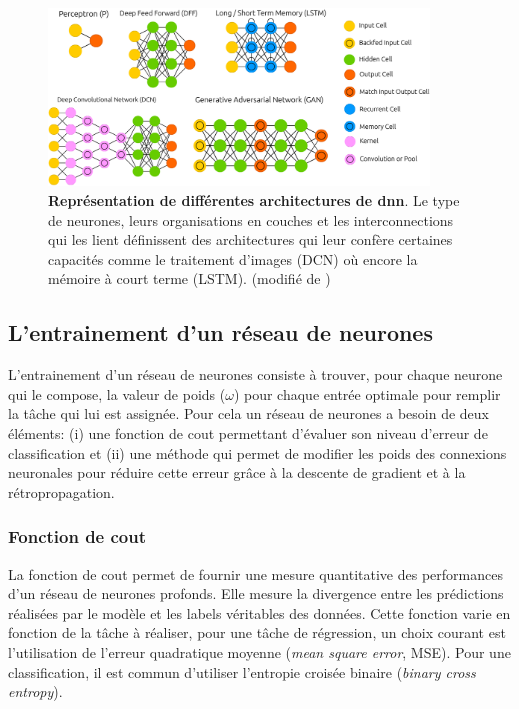 \begin{figure}[!ht]
 \centering
 \includegraphics[width=0.9\textwidth]{figures/dnn_archi.png}
 \caption[Représentation de différentes architectures de \gls{dnn}]{\textbf{Représentation de différentes architectures de \gls{dnn}}. Le type de neurones, leurs organisations en couches et les interconnections qui les lient définissent des architectures qui leur confère certaines capacités comme le traitement d'images (DCN) où encore la mémoire à court terme (LSTM). (modifié de \cite{leijnen_neural_2016})}
 \label{fig:dnn_archi}
\end{figure}


\subsection{L'entrainement d'un réseau de neurones}
L'entrainement d'un réseau de neurones consiste à trouver, pour chaque neurone qui le compose, la valeur de poids ($\omega$) pour chaque entrée optimale pour remplir la tâche qui lui est assignée. Pour cela un réseau de neurones a besoin de deux éléments: (i) une fonction de cout permettant d'évaluer son niveau d'erreur de classification et (ii) une méthode qui permet de modifier les poids des connexions neuronales pour réduire cette erreur grâce à la descente de gradient et à la rétropropagation.

\subsubsection{Fonction de cout}
La fonction de cout permet de fournir une mesure quantitative des performances d'un réseau de neurones profonds. Elle mesure la divergence entre les prédictions réalisées par le modèle et les labels véritables des données. Cette fonction varie en fonction de la tâche à réaliser, pour une tâche de régression, un choix courant est l'utilisation de l'erreur quadratique moyenne (\textit{mean square error}, MSE). Pour une classification, il est commun d'utiliser l'entropie croisée binaire (\textit{binary cross entropy}). 


